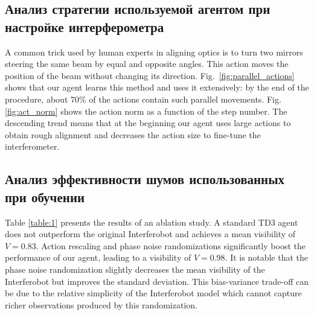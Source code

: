 \subsection{Анализ стратегии используемой агентом при настройке интерферометра}

A common trick used by human experts in aligning optics is to turn two mirrors steering the same beam by equal and opposite angles. This action moves the position of the beam without changing its direction. Fig.~\ref{fig:parallel_actions} shows that our agent learns this method and uses it extensively: by the end of the procedure, about 70\% of the actions contain such parallel movements. 
Fig. \ref{fig:act_norm} shows the action norm as a function of the step number. The descending trend means that at the beginning our agent uses large actions to obtain rough alignment and decreases the action size to fine-tune the interferometer. 

\subsection{Анализ эффективности шумов использованных при обучении}

Table \ref{table:1} presents the results of an ablation study. A standard TD3 agent does not outperform the original Interferobot and achieves a mean visibility of $V = 0.83$. Action rescaling and phase noise randomizations significantly boost the performance of our agent, leading to a visibility of $V = 0.98$. It is notable that the phase noise randomization slightly decreases the mean visibility of the Interferobot but improves the standard deviation. This bias-variance trade-off can be due to the relative simplicity of the Interferobot model which cannot capture richer observations produced by this randomization.  

